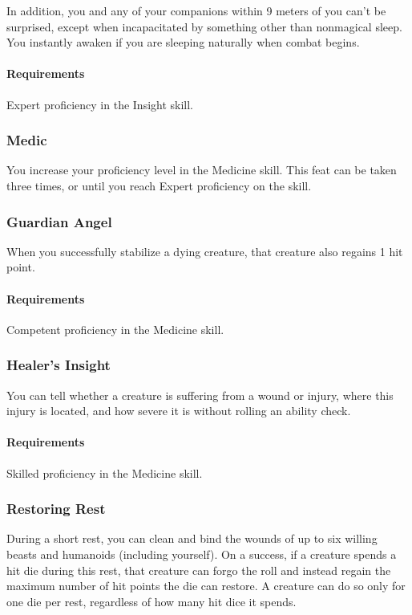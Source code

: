     In addition, you and any of your companions within 9 meters of you can't be surprised, except when incapacitated by something other than nonmagical sleep.
    You instantly awaken if you are sleeping naturally when combat begins.
    \paragraph{Requirements} Expert proficiency in the Insight skill.
\subsubsection{Medic} \label{feat::medic}
    You increase your proficiency level in the Medicine skill.
    This feat can be taken three times, or until you reach Expert proficiency on the skill.
\subsubsection{Guardian Angel} \label{feat::guardianangel}
    When you successfully stabilize a dying creature, that creature also regains 1 hit point.
    \paragraph{Requirements} Competent proficiency in the Medicine skill.
\subsubsection{Healer's Insight} \label{feat::healersinsight}
    You can tell whether a creature is suffering from a wound or injury, where this injury is located, and how severe it is without rolling an ability check.
    \paragraph{Requirements} Skilled proficiency in the Medicine skill.
\subsubsection{Restoring Rest} \label{feat::restoringrest}
    During a short rest, you can clean and bind the wounds of up to six willing beasts and humanoids (including yourself).
    On a success, if a creature spends a hit die during this rest, that creature can forgo the roll and instead regain the maximum number of hit points the die can restore.
    A creature can do so only for one die per rest, regardless of how many hit dice it spends.

